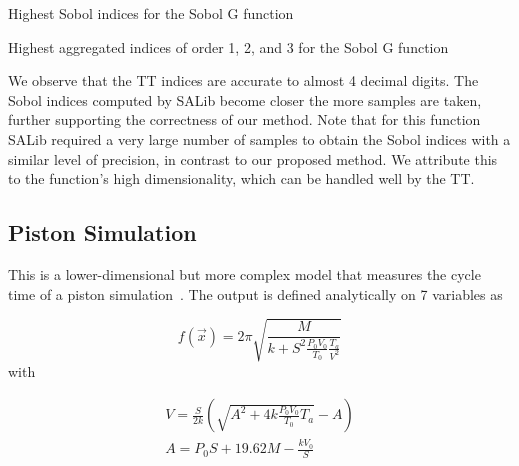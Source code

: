 \documentclass[review, twocolumn]{svjour3}          %
\begin{document}
\begin{table*}[h]
	\centering
	\caption{Highest Sobol indices for the Sobol G function}
	
	\label{tab:Sobol1}
\end{table*}

\begin{table*}[h]
	\centering
	\caption{Highest aggregated indices of order 1, 2, and 3 for the Sobol G function}
	
	\label{tab:Sobol2}
\end{table*}

We observe that the TT indices are accurate to almost 4 decimal digits. The Sobol indices computed by SALib become closer the more samples are taken, further supporting the correctness of our method. Note that for this function SALib required a very large number of samples to obtain the Sobol indices with a similar level of precision, in contrast to our proposed method. We attribute this to the function's high dimensionality, which can be handled well by the TT.

\subsection{Piston Simulation}

This is a lower-dimensional but more complex model that measures the cycle time of a piston simulation~\cite{KZ:98}. The output is defined analytically on 7 variables as

\begin{equation}
f(\vec{x}) = 2 \pi \sqrt{\frac{M}{k + S^2 \frac{P_0 V_0}{T_0} \frac{T_a}{V^2}}}
\end{equation}
%
with

\begin{equation}
\begin{gathered}
V = \frac{S}{2k} \left(\sqrt{A^2 + 4k \frac{P_0 V_0}{T_0} T_a} - A\right) \\
A = P_0 S + 19.62 M - \frac{k V_0}{S}
\end{gathered}
\end{equation}
\end{document}
